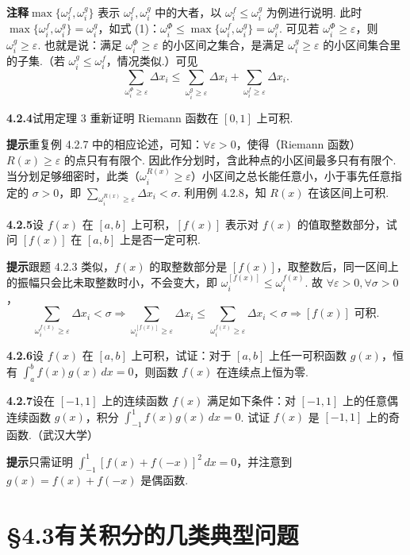 \documentclass[UTF8, 12pt, fontset=fandol, oneside]{ctexart}
\begin{document}
\noindent\textbf{注释}\quad $\max\{\omega_i^f,\omega_i^g\}$ 表示 $\omega_i^f,\omega_i^g$ 中的大者，以 $\omega_i^f\le\omega_i^g$ 为例进行说明. 此时 $\max\{\omega_i^f,\omega_i^g\}=\omega_i^g$，如式 (1)：$\omega_i^\Phi\le\max\{\omega_i^f,\omega_i^g\}=\omega_i^g$. 可见若 $\omega_i^\Phi\ge\varepsilon$，则 $\omega_i^g\ge\varepsilon$. 也就是说：满足 $\omega_i^\Phi\ge\varepsilon$ 的小区间之集合，是满足 $\omega_i^g\ge\varepsilon$ 的小区间集合里的子集.（若 $\omega_i^g\le\omega_i^f$，情况类似.）可见
\[
\sum_{\omega_i^\Phi\ge\varepsilon}\Delta x_i
\le
\sum_{\omega_i^g\ge\varepsilon}\Delta x_i
+
\sum_{\omega_i^f\ge\varepsilon}\Delta x_i.
\]

\noindent\textbf{4.2.4}\quad 试用定理 3 重新证明 Riemann 函数在 $[0,1]$ 上可积.

\noindent\textbf{提示}\quad 重复例 4.2.7 中的相应论述，可知：$\forall\varepsilon>0$，使得（Riemann 函数）$R(x)\ge\varepsilon$ 的点只有有限个. 因此作分划时，含此种点的小区间最多只有有限个. 当分划足够细密时，此类（$\omega_i^{R(x)}\ge\varepsilon$）小区间之总长能任意小，小于事先任意指定的 $\sigma>0$，即 $\sum_{\omega_i^{R(x)}\ge\varepsilon}\Delta x_i<\sigma$. 利用例 4.2.8，知 $R(x)$ 在该区间上可积.

\noindent\textbf{4.2.5}\quad 设 $f(x)$ 在 $[a,b]$ 上可积，$[f(x)]$ 表示对 $f(x)$ 的值取整数部分，试问 $[f(x)]$ 在 $[a,b]$ 上是否一定可积.

\noindent\textbf{提示}\quad 跟题 4.2.3 类似，$f(x)$ 的取整数部分是 $[f(x)]$，取整数后，同一区间上的振幅只会比未取整数时小，不会变大，即 $\omega_i^{[f(x)]}\le\omega_i^{f(x)}$. 故 $\forall\varepsilon>0,\forall\sigma>0$，
\[
\sum_{\omega_i^{f(x)}\ge\varepsilon}\Delta x_i<\sigma
\Rightarrow
\sum_{\omega_i^{[f(x)]}\ge\varepsilon}\Delta x_i
\le
\sum_{\omega_i^{f(x)}\ge\varepsilon}\Delta x_i<\sigma
\Rightarrow [f(x)]\text{ 可积.}
\]

\noindent\textbf{4.2.6}\quad 设 $f(x)$ 在 $[a,b]$ 上可积，试证：对于 $[a,b]$ 上任一可积函数 $g(x)$，恒有 $\int_a^b f(x)g(x)\,dx=0$，则函数 $f(x)$ 在连续点上恒为零.

\noindent\textbf{4.2.7}\quad 设在 $[-1,1]$ 上的连续函数 $f(x)$ 满足如下条件：对 $[-1,1]$ 上的任意偶连续函数 $g(x)$，积分 $\int_{-1}^1 f(x)g(x)\,dx=0$. 试证 $f(x)$ 是 $[-1,1]$ 上的奇函数.（武汉大学）

\noindent\textbf{提示}\quad 只需证明 $\int_{-1}^1[f(x)+f(-x)]^2\,dx=0$，并注意到 $g(x)=f(x)+f(-x)$ 是偶函数.

\section*{§4.3\quad 有关积分的几类典型问题}
\end{document}
